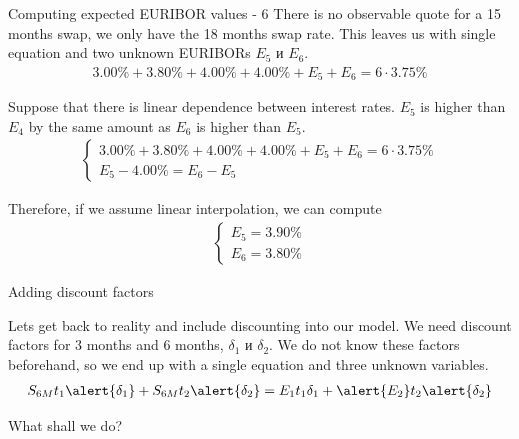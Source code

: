 \documentclass{beamer}
\begin{document}
\begin{frame}{Computing expected EURIBOR values - 6}
\justify
There is no observable quote for a 15 months swap, we only have the 18 months swap rate. This leaves us with single equation and two unknown EURIBORs $E_5$ и $E_6$.
\begin{align*}
3.00\%+3.80\%+4.00\%+4.00\%+E_5+E_6 = 6\cdot3.75\%
\end{align*}

\justify
Suppose that there is linear dependence between interest rates. $E_5$ is higher than $E_4$ by the same amount as $E_6$ is higher than $E_5$.
\begin{align*}
\begin{cases}
3.00\%+3.80\%+4.00\%+4.00\%+E_5+E_6 = 6\cdot3.75\% \\
E_5 - 4.00\% = E_6 - E_5
\end{cases}
\end{align*}

Therefore, if we assume linear interpolation, we can compute
\begin{align*}
\begin{cases}
E_5 = 3.90\% \\
E_6 = 3.80\%
\end{cases}
\end{align*}
\end{frame}



\begin{frame}{Adding discount factors}
\centering
{}

\justify
Lets get back to reality and include discounting into our model. We need discount factors for 3 months and 6 months,
$\delta_1$ и $\delta_2$. We do not know these factors beforehand, so we end up with a single equation and three unknown variables. 
\begin{align*}
S_{6M}t_1\alert{\delta_1} + S_{6M}t_2\alert{\delta_2} = E_1t_1\delta_1 + \alert{E_2}t_2\alert{\delta_2}
\end{align*}

\justify
What shall we do?
\end{frame}
\end{document}
